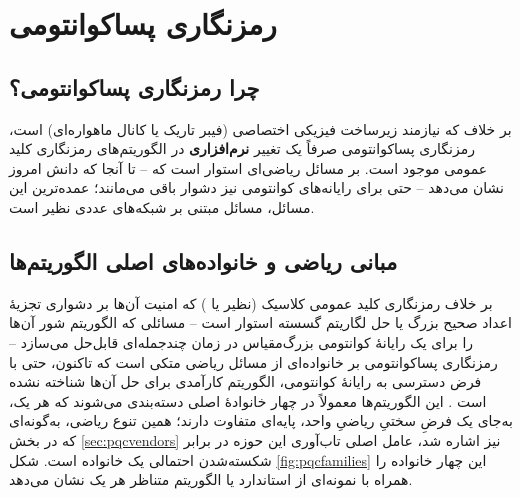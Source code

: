 \chapter{رمزنگاری پساکوانتومی }

\section{چرا رمزنگاری پساکوانتومی؟}

بر خلاف  که نیازمند زیرساخت فیزیکی اختصاصی (فیبر تاریک یا کانال ماهواره‌ای) است، رمزنگاری پساکوانتومی  صرفاً یک تغییر \textbf{نرم‌افزاری} در الگوریتم‌های رمزنگاری کلید عمومی موجود است.  بر مسائل ریاضی‌ای استوار است که -- تا آنجا که دانش امروز نشان می‌دهد -- حتی برای رایانه‌های کوانتومی نیز دشوار باقی می‌مانند؛ عمده‌ترین این مسائل، مسائل مبتنی بر شبکه‌های عددی  نظیر  است.

\section{مبانی ریاضی و خانواده‌های اصلی الگوریتم‌ها}
\label{sec:pqcfoundations}

بر خلاف رمزنگاری کلید عمومی کلاسیک (نظیر  یا ) که امنیت آن‌ها بر دشواری تجزیهٔ اعداد صحیح بزرگ یا حل لگاریتم گسسته استوار است -- مسائلی که الگوریتم شور \Cite{shor1997} آن‌ها را برای یک رایانهٔ کوانتومی بزرگ‌مقیاس در زمان چندجمله‌ای قابل‌حل می‌سازد -- رمزنگاری پساکوانتومی بر خانواده‌ای از مسائل ریاضی متکی است که تاکنون، حتی با فرض دسترسی به رایانهٔ کوانتومی، الگوریتم کارآمدی برای حل آن‌ها شناخته نشده است \Cite{djordjevic2025pqc}. این الگوریتم‌ها معمولاً در چهار خانوادهٔ اصلی دسته‌بندی می‌شوند که هر یک، به‌جای یک فرضِ سختیِ ریاضیِ واحد، پایه‌ای متفاوت دارند؛ همین تنوع ریاضی، به‌گونه‌ای که در بخش \ref{sec:pqcvendors} نیز اشاره شد، عامل اصلی تاب‌آوری این حوزه در برابر شکسته‌شدن احتمالی یک خانواده است. شکل \ref{fig:pqcfamilies} این چهار خانواده را همراه با نمونه‌ای از استاندارد یا الگوریتم متناظر هر یک نشان می‌دهد.

